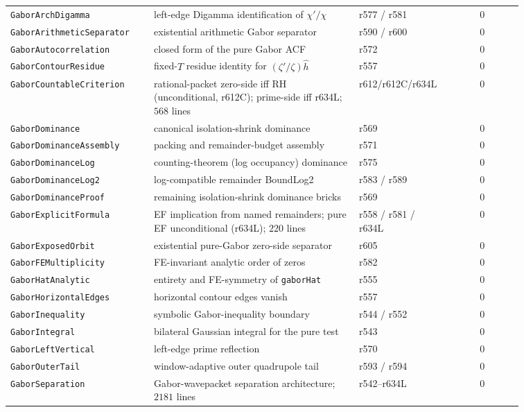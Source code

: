 \documentclass[11pt]{article}
\theoremstyle{definition}
\theoremstyle{remark}
\begin{document}
\begin{longtable}{@{}
  >{\raggedright\arraybackslash}p{0.28\linewidth}
  >{\raggedright\arraybackslash}p{0.40\linewidth}
  >{\raggedright\arraybackslash}p{0.18\linewidth}
  c@{}}
\texttt{GaborArchDigamma} & left-edge Digamma identification of $\chi'/\chi$ & r577 / r581 & 0\\
\texttt{GaborArithmeticSeparator} & existential arithmetic Gabor separator & r590 / r600 & 0\\
\texttt{GaborAutocorrelation} & closed form of the pure Gabor ACF & r572 & 0\\
\texttt{GaborContourResidue} & fixed-$T$ residue identity for $(\zeta'/\zeta)\hat h$ & r557 & 0\\
\texttt{GaborCountableCriterion} & rational-packet zero-side iff RH (unconditional, r612C); prime-side iff r634L; $568$ lines & r612/r612C/r634L & 0\\
\texttt{GaborDominance} & canonical isolation-shrink dominance & r569 & 0\\
\texttt{GaborDominanceAssembly} & packing and remainder-budget assembly & r571 & 0\\
\texttt{GaborDominanceLog} & counting-theorem (log occupancy) dominance & r575 & 0\\
\texttt{GaborDominanceLog2} & log-compatible remainder BoundLog2 & r583 / r589 & 0\\
\texttt{GaborDominanceProof} & remaining isolation-shrink dominance bricks & r569 & 0\\
\texttt{GaborExplicitFormula} & EF implication from named remainders; pure EF unconditional (r634L); $220$ lines & r558 / r581 / r634L & 0\\
\texttt{GaborExposedOrbit} & existential pure-Gabor zero-side separator & r605 & 0\\
\texttt{GaborFEMultiplicity} & FE-invariant analytic order of zeros & r582 & 0\\
\texttt{GaborHatAnalytic} & entirety and FE-symmetry of \texttt{gaborHat} & r555 & 0\\
\texttt{GaborHorizontalEdges} & horizontal contour edges vanish & r557 & 0\\
\texttt{GaborInequality} & symbolic Gabor-inequality boundary & r544 / r552 & 0\\
\texttt{GaborIntegral} & bilateral Gaussian integral for the pure test & r543 & 0\\
\texttt{GaborLeftVertical} & left-edge prime reflection & r570 & 0\\
\texttt{GaborOuterTail} & window-adaptive outer quadrupole tail & r593 / r594 & 0\\
\texttt{GaborSeparation} & Gabor-wavepacket separation architecture; $2181$ lines & r542--r634L & 0\\

\end{longtable}
\end{document}
